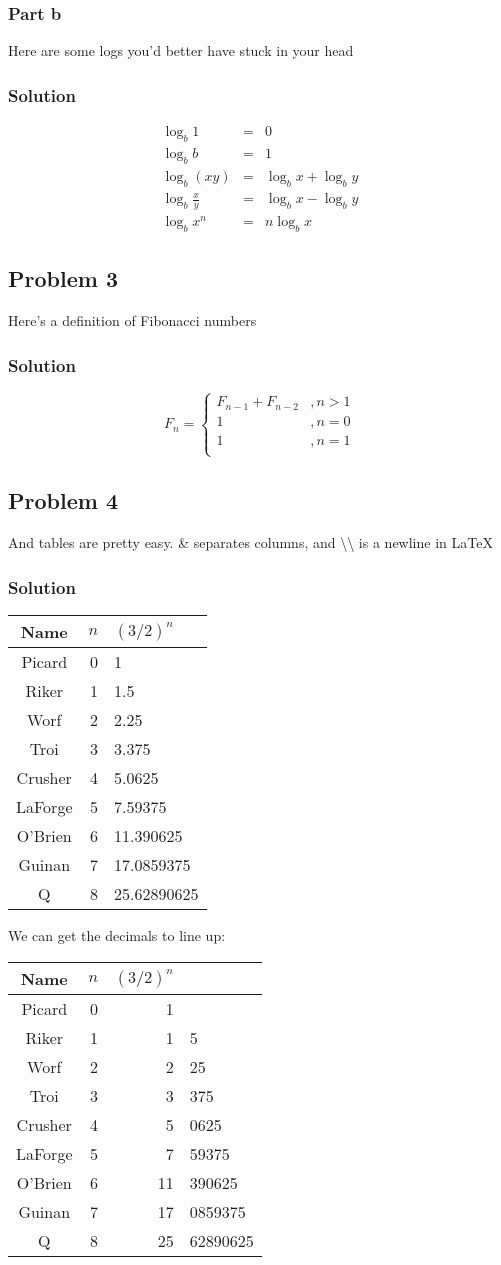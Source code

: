 \documentclass[10pt,letterpaper,oneside]{article}
\newcommand{\Problem}[1]{\subsection*{Problem #1}}
\newcommand{\Part}[1]{\subsubsection*{Part #1}}
\newcommand{\Solution}{\subsubsection*{Solution}}
\begin{document}
	\Part{b}
	Here are some logs you'd better have stuck in your head

	\Solution
		\begin{eqnarray}
			\log_b 1 & = & 0 \\
			\log_b b & = & 1 \\
			\log_b (xy) & = & \log_b x + \log_b y \\
			\log_b\frac{x}{y} & = & \log_b x - \log_b y \\
			\log_b x^n & = & n\log_b x 
		\end{eqnarray}

\Problem{3}
	Here's a definition of Fibonacci numbers

	\Solution
		\[
			F_n = \left\lbrace%
			\begin{array}{cc}
				F_{n-1} + F_{n-2} &, n > 1 \\
				1 &, n=0 \\
				1 &, n=1 \\
			\end{array} \right.
		\]

\Problem{4}
	And tables are pretty easy.  \& separates columns, and
	\textbackslash{}\textbackslash{} is a newline in \LaTeX

	\Solution
	\begin{center}
	\begin{tabular}{ c | r | l }
		Name & $n$ & $(3/2)^n$ \\
		\hline
		Picard & 0  & 1 \\
		Riker & 1  & 1.5 \\
		Worf & 2	& 2.25 \\
		Troi & 3	& 3.375 \\
		Crusher & 4	& 5.0625 \\
		LaForge & 5	& 7.59375 \\
		O'Brien & 6	& 11.390625 \\
		Guinan & 7	& 17.0859375 \\
		Q & 8	& 25.62890625 
	\end{tabular}
	\end{center}

	We can get the decimals to line up:

	\begin{center}
	\begin{tabular}{ c | r | r @{.} l }
		Name & $n$ & $(3/2)^n$ \\
		\hline
		Picard & 0  & 1 & \\
		Riker & 1  & 1 & 5 \\
		Worf & 2	& 2 & 25 \\
		Troi & 3	& 3 & 375 \\
		Crusher & 4	& 5 & 0625 \\
		LaForge & 5	& 7 & 59375 \\
		O'Brien & 6	& 11 & 390625 \\
		Guinan & 7	& 17 & 0859375 \\
		Q & 8	& 25 & 62890625 
	\end{tabular}
	\end{center}
\end{document}
